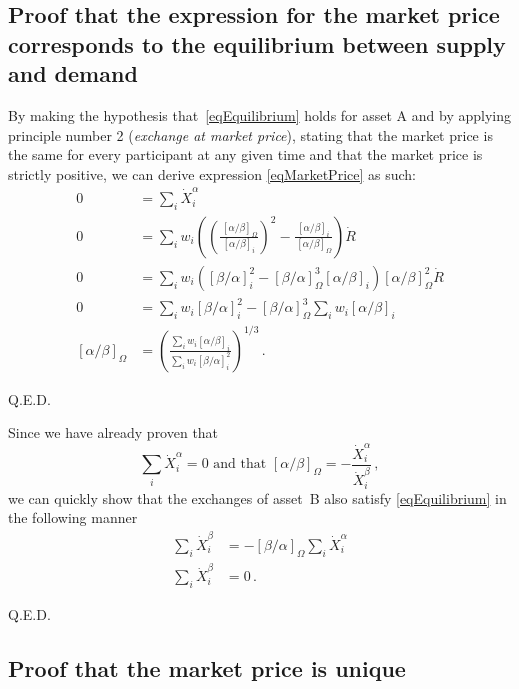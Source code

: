\documentclass[letterpaper]{article}
\newcommand{\priceAB}{\left[\alpha / \beta\right]}
\newcommand{\priceBA}{\left[\beta / \alpha\right]}
\begin{document}
\subsection{Proof that the expression for the market price corresponds to the equilibrium between supply and demand}\label{secProofMarketprice}

By making the hypothesis that~\eqref{eqEquilibrium} holds for asset A and by applying principle number 2 (\emph{exchange at market price}), stating that the market price is the same for every participant at any given time and that the market price is strictly positive, we can derive expression \eqref{eqMarketPrice} as such:
\begin{align*}
    0 &= \sum_i \dot{X}_i^\alpha\\
    0 &= \sum_i w_i \left( \left( \frac{\hspace{2pt}\priceAB_\Omega}{\priceAB_i}\right)^2 - \frac{\priceAB_i}{\hspace{2pt}\priceAB_\Omega} \right) \dot{R} \\
    0 &= \sum_i w_i \left( \priceBA_i^2 - \priceBA_\Omega^3 \priceAB_i \right) \priceAB_\Omega^2 \dot{R}\\
    0 &= \sum_i w_i \priceBA_i^2 - \priceBA_\Omega^3 \sum_i w_i \priceAB_i\\
    \priceAB_\Omega &= \left( \frac{\displaystyle \sum_i w_i \priceAB_i}{\displaystyle \sum_i w_i \priceBA_i^2}\right)^{1/3} \,.
\end{align*}
\begin{flushright}
Q.E.D.
\end{flushright}
Since we have already proven that
\begin{equation*}
    \sum_i \dot{X}_i^\alpha = 0 \text{ and that }\priceAB_\Omega = -\frac{\dot{X}_i^\alpha}{\dot{X}_i^\beta}\,,
\end{equation*}
we can quickly show that the exchanges of asset~B also satisfy \eqref{eqEquilibrium} in the following manner
\begin{align*}
    \sum_i \dot{X}_i^\beta &= -\priceBA_\Omega \sum_i \dot{X}_i^\alpha\\
    \sum_i \dot{X}_i^\beta &= 0 \,.
\end{align*}
\begin{flushright}
Q.E.D.
\end{flushright}

\subsection{Proof that the market price is unique}\label{secProofUniqueness}
\end{document}
